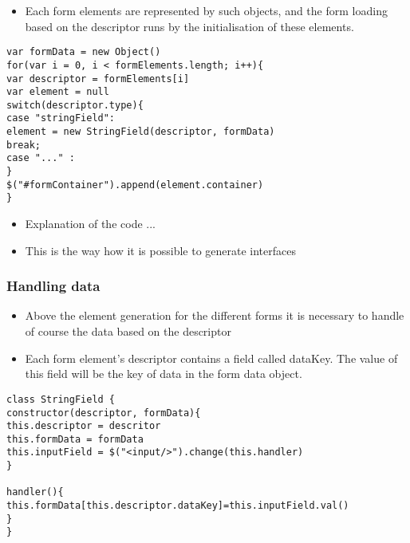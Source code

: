 \begin{itemize}
	\item Each form elements are represented by such objects, and the form loading based on the descriptor runs by the initialisation of these elements.  
\end{itemize}

\begin{lstlisting}[basicstyle=\footnotesize, frame=single, caption={Form generation based on configuration data}, captionpos=b]
var formData = new Object()
for(var i = 0, i < formElements.length; i++){
var descriptor = formElements[i]
var element = null
switch(descriptor.type){
case "stringField":
element = new StringField(descriptor, formData)
break;
case "..." : 
}
$("#formContainer").append(element.container)
}	
\end{lstlisting}



\begin{itemize}
	\item Explanation of the code ...
	\item This is the way how it is possible to generate interfaces
\end{itemize}


\subsubsection{Handling data}

\begin{itemize}
	\item Above the element generation for the different forms it is necessary to handle of course the data based on the descriptor
	\item Each form element's descriptor contains a field called dataKey. The value of this field will be the key of data in the form data object.
\end{itemize}


\begin{lstlisting}[basicstyle=\footnotesize, frame=single, caption={Data saving}, captionpos=b]
class StringField {
constructor(descriptor, formData){
this.descriptor = descritor
this.formData = formData
this.inputField = $("<input/>").change(this.handler)
}

handler(){
this.formData[this.descriptor.dataKey]=this.inputField.val() 
}			
}
\end{lstlisting}



